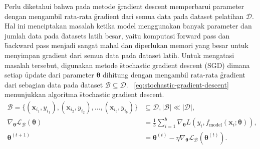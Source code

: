     Perlu diketahui bahwa pada metode \f{gradient descent} memperbarui parameter dengan mengambil rata-rata \f{gradient} dari semua data pada \f{dataset} pelatihan $\mathcal{D}$. Hal ini menciptakan masalah ketika model menggunakan banyak parameter dan jumlah data pada \f{datasets} latih besar, yaitu komputasi \f{forward pass} dan \f{backward pass} menjadi sangat mahal dan diperlukan memori yang besar untuk menyimpan gradient dari semua data pada \f{dataset} latih. Untuk mengatasi masalah tersebut, digunakan metode \f{stochastic gradient descent} (SGD) dimana setiap \f{update} dari parameter $\bm{\theta}$ dihitung dengan mengambil rata-rata \f{gradient} dari sebagian data pada \f{dataset} $\mathcal{B}\subseteq\mathcal{D}$. \equ~\ref{eq:stochastic-gradient-descent} menunjukkan algoritma \f{stochastic gradient descent}.
    \begin{align}
        \mathcal{B} = \{(\mathbf{x}_{i_1}, y_{i_1}), (\mathbf{x}_{i_2}, y_{i_2}), \dots, (\mathbf{x}_{i_b}, y_{i_b})\} &\subseteq \mathcal{D}, \mid \mathcal{B} \mid \ll \mid \mathcal{D} \mid, \\
        \label{eq:stochastic-gradient-descent-approx}
        \nabla_{\bm{\theta}}{\mathcal{L_B}}(\bm{\theta}) &= 
         \frac{1}{b} \sum_{i=1}^{b} \nabla_{\bm{\theta}} L(y_{i}, f_{\text{model}}(\mathbf{x}_{i}; \bm{\theta})), \\
        \label{eq:stochastic-gradient-descent}
        \bm{\theta}^{(t+1)} &= \bm{\theta}^{(t)} - \eta \nabla_{\bm{\theta}} \mathcal{L_B}(\bm{\theta}^{(t)}).
    \end{align}

